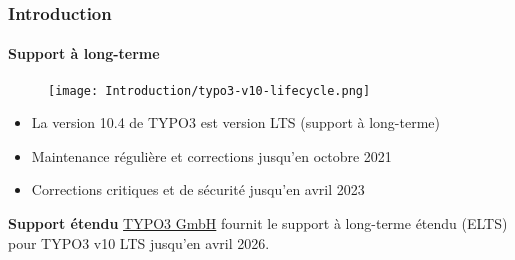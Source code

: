 
\begin{frame}[fragile]
	\frametitle{Introduction}
	\framesubtitle{Support à long-terme}

	\begin{figure}
		\texttt{[image: Introduction/typo3-v10-lifecycle.png]}
	\end{figure}

	\begin{itemize}
		\item La version 10.4 de TYPO3 est version LTS (support à long-terme)
		\item Maintenance régulière et corrections jusqu'en octobre 2021
		\item Corrections critiques et de sécurité jusqu'en avril 2023
	\end{itemize}
	\vspace{0.2cm}
	\textbf{Support étendu}\newline
	\smaller
		\href{https://typo3.com}{TYPO3 GmbH} fournit le support à long-terme étendu
			(ELTS) pour TYPO3 v10 LTS jusqu'en avril 2026.
	\normalsize

\end{frame}

